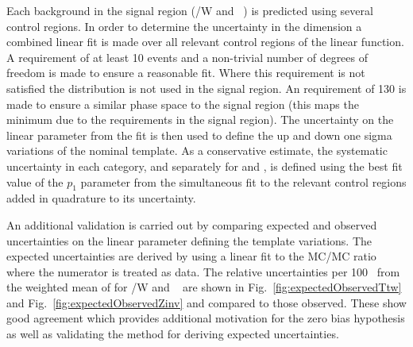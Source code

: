 Each background in the signal region (\ttbar/W  and \zInv~) is predicted 
using several control regions. In order to determine the uncertainty in
the \mht dimension a combined linear fit is made over all relevant control regions
of the linear function. A requirement of at least 10 events and a non-trivial
number of degrees of freedom is made to ensure a reasonable fit. Where this
requirement is not satisfied the \mht distribution is not used in the signal region.
An \mht requirement of 130 \GeV is made to ensure a similar phase space to 
the signal region (this maps the minimum \mht due to the \alt requirements in the signal region).
The uncertainty on the linear parameter from the fit is then
used to define the up and down one sigma variations of the nominal template.
As a conservative estimate, the systematic uncertainty in each category, and separately
for \zInv and \ttW, is defined using the best fit value of the $p_1$ parameter 
from the simultaneous fit to the relevant control regions
added in quadrature to its uncertainty.


An additional validation is carried out by comparing expected and observed uncertainties
on the linear parameter defining the template variations.
The expected uncertainties are derived by using a linear fit to the MC/MC ratio where the numerator
is treated as data. The relative uncertainties per 100 \GeV~from the weighted mean of \mht
for \ttbar/W and \zInv~ are shown in Fig.~\ref{fig:expectedObservedTtw} 
and Fig.~\ref{fig:expectedObservedZinv} and compared to those observed.
These show good agreement which provides additional motivation for the 
zero bias hypothesis as well as validating the method for deriving expected uncertainties.


